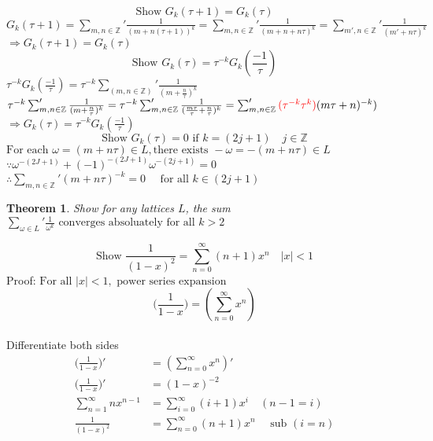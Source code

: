 \documentclass{book}
\newtheorem{theorem}{Theorem}
\begin{document}
\noindent
\[\text{Show } G_{k}(\tau + 1) = G_{k}(\tau)\]
$G_{k}(\tau + 1) = \sum_{m, n \in \mathbb{Z}}' \frac{1}{(m+n(\tau+1))^k} = \sum_{m, n \in \mathbb{Z}}' \frac{1}{(m + n + n\tau)^k} = \sum_{m', n \in \mathbb{Z} }' \frac{1}{(m' + n\tau)^k}$\\
$\Rightarrow G_{k}(\tau + 1) = G_{k}(\tau)$\\

\noindent
\[\text{Show } G_{k}(\tau) = \tau^{-k} G_{k}(\frac{-1}{\tau})\]
$\tau^{-k} G_{k}(\frac{-1}{\tau}) =  \tau^{-k} \sum_{(m, n \in \mathbb{Z} )}' \frac{1}{(m+\frac{n}{\tau})^{k}}$\\
$\tau^{-k} \sum_{m, n \in \mathbb{Z}}' \frac{1}{(m + \frac{n}{\tau})^{k}} = \tau^{-k} \sum_{m, n \in \mathbb{Z}}' \frac{1}{(\frac{m\tau}{\tau} + \frac{n}{\tau})^{k}} = \sum_{m, n \in \mathbb{Z}}' \textcolor{red}{(\tau^{-k}\tau^{k})} (m\tau + n)^{-k})$\\
$\Rightarrow G_{k}(\tau) = \tau^{-k} G_{k}(\frac{-1}{\tau})$\\


\noindent
\[\text{Show }G_{k}(\tau) = 0 \text{ if } k = (2j+1) \quad j \in \mathbb{Z} \]
$\text{For each }\omega = (m+n\tau) \in L, \text{there exists } -\omega = -(m+n\tau) \in L $\\
$\because \omega ^{-(2J+1)} + (-1)^{-(2J+1)}\omega^{-(2j+1)} = 0$\\
$\therefore \sum_{m,n \in \mathbb{Z}}' (m+n\tau)^{-k} = 0\quad \text{ for all } k \in (2j+1)$\\

\begin{theorem}
Show for any lattices $L$, the sum $\sum_{\omega \in \mathit{L}}' \frac{1}{\omega^{k}} \text{ converges absoluately for all } k > 2$
\end{theorem}


\pagebreak
\noindent
\[\text{Show }\frac{1}{(1-x)^2} = \sum_{n=0}^{\infty} (n+1)x^n \quad |x| < 1\]
Proof:
$\text{For all } |x| < 1, \text{ power series expansion} $\\
\[(\frac{1}{1-x}\big) = (\sum_{n=0}^{\infty} x^n)\]\\
Differentiate both sides\\
\begin{equation}
\begin{aligned}
(\frac{1}{1-x}\big)' &= (\sum_{n=0}^{\infty} x^n)' \\
(\frac{1}{1-x}\big)' &= (1-x)^{-2}\\ 
\sum_{n=1}^{\infty} nx^{n-1} &= \sum_{i=0}^{\infty} (i+1)x^{i} \quad (n-1=i)\\
\frac{1}{(1-x)^2} &= \sum_{n=0}^{\infty} (n+1)x^{n} \quad \text{ sub }(i = n)\\
\end{aligned}
\end{equation}
\end{document}
